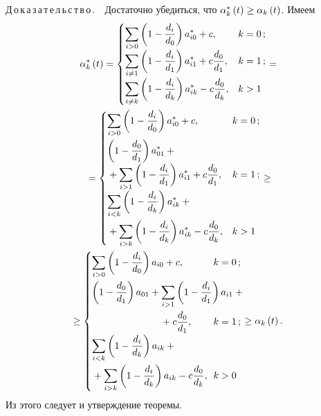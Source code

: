 \begin{multicols}{2}
\noindent
Д\,о\,к\,а\,з\,а\,т\,е\,л\,ь\,с\,т\,в\,о\,.\ \  Достаточно убедиться, что  $\alpha^*_{k}\left( t\right) \hm\ge 
\alpha_{k}\left( t\right) $. Имеем
\begin{multline*}
    \alpha^*_{k}\left( t\right) =
    \begin{cases}
             \displaystyle  \sum\limits_{i > 0}\left(1-\fr{d_i}{d_0}\right)a^*_{i0} + c, & k= 0\,;\\
             \displaystyle  \sum\limits_{i \neq 1}\left(1-\fr{d_i}{d_1}\right)a^*_{i1} + 
c\fr{d_0}{d_1}, & k = 1\,;\\
             \displaystyle  \sum\limits_{i \neq k}\left(1-\fr{d_i}{d_k}\right)a^*_{ik} - 
c\fr{d_0}{d_k}, & k > 1\\
    \end{cases} 
    ={}\\
    {}=
    \begin{cases}
         \displaystyle  \sum\limits_{i > 0}\left(1-\fr{d_i}{d_0}\right)a^*_{i0} + c, & k= 0\,;\\[12pt]
          \displaystyle \left(1-\fr{d_0}{d_1}\right)a^*_{01} + {}&\\[6pt]
          \displaystyle {}+\sum\limits_{i > 1}\left(1-
\fr{d_i}{d_1}\right)a^*_{i1} + c\fr{d_0}{d_1}, & k = 1\,;\\[6pt]
          \displaystyle \sum\limits_{i < k}\left(1-\fr{d_i}{d_k}\right)a^*_{ik} +{}&\\[12pt]
          \displaystyle {}+ \sum\limits_{i > k}\left(1-
\fr{d_i}{d_k}\right)a^*_{ik} - c\fr{d_0}{d_k}, & k > 1\\[6pt]
\end{cases} \ge{}
   \\
\!\!\!\!  {}  \ge
    \begin{cases}
       \displaystyle \sum\limits_{i > 0}\left(1-\fr{d_i}{d_0}\right)a_{i0} + c, & \hspace*{-15mm}k= 0\,;\\[12pt]
        \left(1-\fr{d_0}{d_1}\right)a_{01} +        \displaystyle\sum\limits_{i > 1}\left(1-
\fr{d_i}{d_1}\right)a_{i1} + {}\\[12pt]
\hspace{25mm}{}+c\fr{d_0}{d_1}, & \hspace*{-15mm} k = 1\,;\\[6pt]
             \displaystyle  \sum\limits_{i < k}\left(1-\fr{d_i}{d_k}\right)a_{ik} +{}\\[12pt]
{}+\displaystyle \sum\limits_{i > k}\left(1-\fr{d_i}{d_k}\right)a_{ik} - c\fr{d_0}{d_k}, & \hspace*{-15mm}k > 0  \\
    \end{cases} \ge \alpha_{k}\left( t\right).
\end{multline*}
Из этого следует и утверждение теоремы.


\end{multicols}
